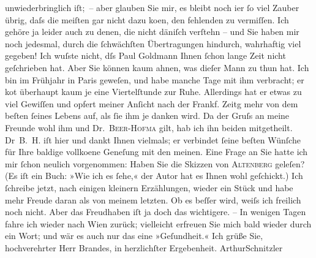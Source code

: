 \begin{ledgroupsized}[t]{13cm}
                    unwiederbringlich iſt; – aber glauben Sie mir, es bleibt noch i{\geminationm}er ſo viel Zauber übrig, daſs die meiſten gar
                    nicht dazu ko{\geminationm}en, den fehlenden zu vermiſſen. Ich
                    gehöre ja leider auch zu denen, die nicht däniſch verſtehn – und Sie haben mir noch jedesmal, durch die
                    ſchwächſten Übertragungen hindurch, wahrhaftig {\pb}viel gegeben!\pend
           \pstart
           Ich wuſste nicht, dſs Paul Goldmann Ihnen
                    ſchon lange Zeit nicht geſchrieben hat. Aber Sie können kaum ahnen, was dieſer
                    Mann zu thun hat. Ich bin im Frühjahr in Paris
                    geweſen, und habe manche Tage mit ihm verbracht; er ko{\geminationm}t überhaupt kaum je eine Viertelſtunde zur Ruhe.
                    Allerdings hat er etwas zu viel Gewiſſen und opfert meiner An{\pb}ſicht nach der Frankf. Zeitg mehr von dem beſten ſeines Lebens auf, als ſie ihm je
                    danken wird. Da der Gruſs an meine Freunde wohl ihm und Dr. \textsc{Beer-Hofma{\geminationn}} gilt, hab ich ihn beiden mitgetheilt. Dr \textsc{B. H.} iſt hier und dankt Ihnen vielmals; er
                    verbindet ſeine beſten Wünſche für Ihre baldige vollko{\geminationm}ene Geneſung mit den meinen.\pend
           \pstart
           {\pb}Eine Frage an Sie hatte ich mir ſchon
                    neulich vorgenommen: Haben Sie die Skizzen von \textsc{Altenberg} geleſen? (Es iſt ein Buch: »Wie ich es ſehe,« der Autor hat es Ihnen wohl
                    geſchickt.)\pend
           \pstart
           Ich ſchreibe jetzt, nach einigen kleinern Erzählungen, wieder ein Stück und habe
                    mehr Freude daran als von meinem letzten. Ob es beſſer wird,  weiſs ich freilich {\pb}noch nicht. Aber das Freudhaben iſt ja doch
                    das wichtigere. –\pend
           \pstart
           In wenigen Tagen fahre ich wieder nach Wien
                    zurück; vielleicht erfreuen Sie mich bald wieder durch ein Wort; und wär es auch
                    nur das eine »Geſundheit.«\pend
           \pstart Ich grüße Sie, hochverehrter Herr Brandes, in herzlichſter Ergebenheit.
                        \spacefill\mbox{ArthurSchnitzler}\pend{}
         

\end{ledgroupsized}
